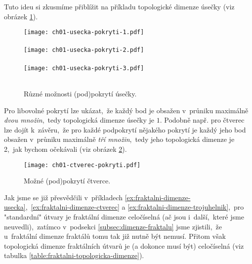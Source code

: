 
Tuto ideu si zkusmíme přiblížit na příkladu topologické dimenze úsečky (viz obrázek \ref{fig:usecka-zjemneni}).
\begin{figure}[h]
    \centering
    \texttt{[image: ch01-usecka-pokryti-1.pdf]}\\\qquad\\
    \texttt{[image: ch01-usecka-pokryti-2.pdf]}\\\qquad\\
    \texttt{[image: ch01-usecka-pokryti-3.pdf]}\\\qquad\\
    \caption{Různé možnosti (pod)pokrytí úsečky.}
    \label{fig:usecka-zjemneni}
\end{figure}
Pro libovolné pokrytí lze ukázat,~že každý bod je obsažen v~průniku maximálně \emph{dvou množin},~tedy topologická dimenze úsečky je $1$. Podobně např. pro čtverec lze dojít k~závěru,~že pro každé podpokrytí nějakého pokrytí je každý jeho bod obsažen v~průniku maximálně \emph{tří množin},~tedy jeho topologická dimenze je 2,~jak bychom očekávali (viz obrázek \ref{fig:ctverec-zjemneni}).
\begin{figure}[h]
    \centering
    \texttt{[image: ch01-ctverec-pokryti.pdf]}
    \caption{Možné (pod)pokrytí čtverce.}
    \label{fig:ctverec-zjemneni}
\end{figure}
Jak jsme se již přesvědčili v~příkladech \ref{ex:fraktalni-dimenze-usecka},~\ref{ex:fraktalni-dimenze-ctverec} a \ref{ex:fraktalni-dimenze-trojuhelnik},~pro "standardní" útvary je fraktální dimenze celočíselná (ač jsou i~další,~které jsme neuvedli),~zatímco v~podsekci \ref{subsec:dimenze-fraktalu} jsme zjistili,~že u~fraktální dimenze fraktálů tomu tak již nutně být nemusí. Přitom však topologická dimenze fraktálních útvarů je (a dokonce musí být) celočíselná (viz tabulka \ref{table:fraktalni-topologicka-dimenze}).
